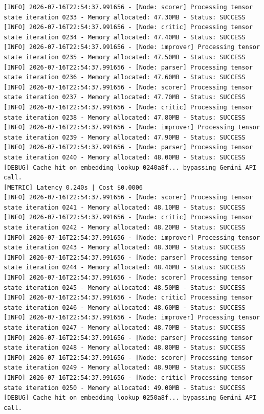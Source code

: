 \documentclass[10pt,journal,compsoc]{IEEEtran}
\begin{document}
\begin{verbatim}
[INFO] 2026-07-16T22:54:37.991656 - [Node: scorer] Processing tensor state iteration 0233 - Memory allocated: 47.30MB - Status: SUCCESS
[INFO] 2026-07-16T22:54:37.991656 - [Node: critic] Processing tensor state iteration 0234 - Memory allocated: 47.40MB - Status: SUCCESS
[INFO] 2026-07-16T22:54:37.991656 - [Node: improver] Processing tensor state iteration 0235 - Memory allocated: 47.50MB - Status: SUCCESS
[INFO] 2026-07-16T22:54:37.991656 - [Node: parser] Processing tensor state iteration 0236 - Memory allocated: 47.60MB - Status: SUCCESS
[INFO] 2026-07-16T22:54:37.991656 - [Node: scorer] Processing tensor state iteration 0237 - Memory allocated: 47.70MB - Status: SUCCESS
[INFO] 2026-07-16T22:54:37.991656 - [Node: critic] Processing tensor state iteration 0238 - Memory allocated: 47.80MB - Status: SUCCESS
[INFO] 2026-07-16T22:54:37.991656 - [Node: improver] Processing tensor state iteration 0239 - Memory allocated: 47.90MB - Status: SUCCESS
[INFO] 2026-07-16T22:54:37.991656 - [Node: parser] Processing tensor state iteration 0240 - Memory allocated: 48.00MB - Status: SUCCESS
[DEBUG] Cache hit on embedding lookup 0240a8f... bypassing Gemini API call.
[METRIC] Latency 0.240s | Cost $0.0006
[INFO] 2026-07-16T22:54:37.991656 - [Node: scorer] Processing tensor state iteration 0241 - Memory allocated: 48.10MB - Status: SUCCESS
[INFO] 2026-07-16T22:54:37.991656 - [Node: critic] Processing tensor state iteration 0242 - Memory allocated: 48.20MB - Status: SUCCESS
[INFO] 2026-07-16T22:54:37.991656 - [Node: improver] Processing tensor state iteration 0243 - Memory allocated: 48.30MB - Status: SUCCESS
[INFO] 2026-07-16T22:54:37.991656 - [Node: parser] Processing tensor state iteration 0244 - Memory allocated: 48.40MB - Status: SUCCESS
[INFO] 2026-07-16T22:54:37.991656 - [Node: scorer] Processing tensor state iteration 0245 - Memory allocated: 48.50MB - Status: SUCCESS
[INFO] 2026-07-16T22:54:37.991656 - [Node: critic] Processing tensor state iteration 0246 - Memory allocated: 48.60MB - Status: SUCCESS
[INFO] 2026-07-16T22:54:37.991656 - [Node: improver] Processing tensor state iteration 0247 - Memory allocated: 48.70MB - Status: SUCCESS
[INFO] 2026-07-16T22:54:37.991656 - [Node: parser] Processing tensor state iteration 0248 - Memory allocated: 48.80MB - Status: SUCCESS
[INFO] 2026-07-16T22:54:37.991656 - [Node: scorer] Processing tensor state iteration 0249 - Memory allocated: 48.90MB - Status: SUCCESS
[INFO] 2026-07-16T22:54:37.991656 - [Node: critic] Processing tensor state iteration 0250 - Memory allocated: 49.00MB - Status: SUCCESS
[DEBUG] Cache hit on embedding lookup 0250a8f... bypassing Gemini API call.

\end{verbatim}
\end{document}
